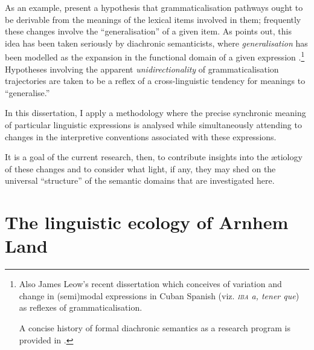 \documentclass[11pt,dvipsnames]{report}
\begin{document}
As an example, \citet{Bybee1994} present a hypothesis that grammaticalisation pathways ought to be derivable from the meanings of the lexical items involved in them; frequently these changes involve the ``generalisation'' of a given item. As \citet[7]{Leow2020} points out, this idea has been taken seriously by diachronic semanticists, where \textit{generalisation} has been modelled as the expansion in the functional domain of a given expression \citep[\textit{e.g.},][]{Deo2015a,Condoravdi2014}.\footnote{Also James Leow's recent \citeyearpar{Leow2020} dissertation which conceives of variation and change in (semi)modal expressions in Cuban Spanish (viz. \textit{\textsc{iba} a, tener que}) as reflexes of grammaticalisation.

A concise history of formal diachronic semantics as a research program is provided in \citet{Yanovich2020}.} 
 Hypotheses involving the apparent \textit{unidirectionality} of grammaticalisation trajectories are taken to be a reflex of a cross-linguistic tendency for meanings to ``generalise.''

 In this dissertation, I apply a methodology where the precise synchronic meaning of particular linguistic expressions is analysed while simultaneously attending to changes in the interpretive conventions associated with these expressions.
 
 It is a goal of the current research, then, to contribute insights into the ætiology of these changes and to consider what light, if any, they may shed on the universal ``structure'' of the semantic domains that are investigated here.

\section{The linguistic ecology of Arnhem Land}\label{sec:ecol}
\end{document}
